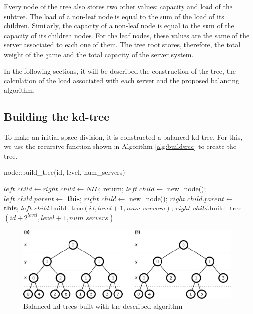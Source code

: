 \documentclass[acmjacm]{acmtrans2m}
\begin{document}
Every node of the tree also stores two other values: capacity and load of the subtree. The load of a non-leaf node is equal to the sum of the load of its children. Similarly, the capacity of a non-leaf node is equal to the sum of the capacity of its children nodes. For the leaf nodes, these values are the same of the server associated to each one of them. The tree root stores, therefore, the total weight of the game and the total capacity of the server system.

In the following sections, it will be described the construction of the tree, the calculation of the load associated with each server and the proposed balancing algorithm.

\subsection{Building the kd-tree}

To make an initial space division, it is constructed a balanced kd-tree. For this, we use the recursive function shown in Algorithm \ref{alg:buildtree} to create the tree.

\begin{algorithm}
\caption{node::build\_tree(id, level, num\_servers)}
\label{alg:buildtree}
\begin{algorithmic}
		\STATE $left\_child \leftarrow right\_child \leftarrow NIL$;
		\STATE return;
	\ELSE
		\STATE $left\_child \leftarrow$ new\_node();
		\STATE $left\_child.parent \leftarrow$ \textbf{this};
		\STATE $right\_child \leftarrow$ new\_node();
		\STATE $right\_child.parent \leftarrow$ \textbf{this};
		\STATE $left\_child$.build\_tree$(id, level + 1, num\_servers)$;
		\STATE $right\_child$.build\_tree$(id + 2^{level}, level + 1, num\_servers)$;
	\ENDIF
\end{algorithmic}
\end{algorithm}

\begin{figure}[!t]
	\centering
	\includegraphics[width=\linewidth]{images/kdtree}
	\caption{Balanced kd-trees built with the described algorithm}
	\label{fig:kdtree}
\end{figure}
\end{document}

